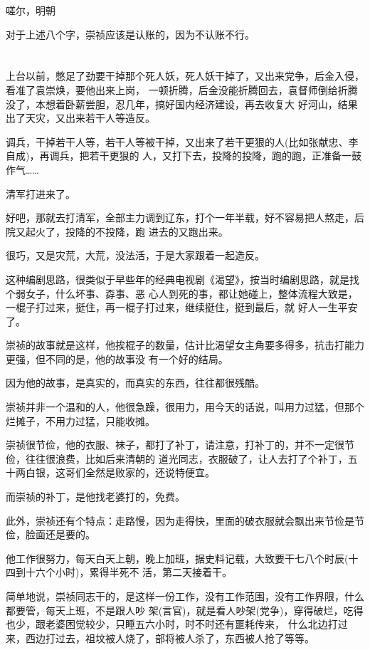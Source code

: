\documentclass[11pt,a4paper,onecolumn]{article}
\begin{document}
嗟尔，明朝

对于上述八个字，崇祯应该是认账的，因为不认账不行。

\section[\thesection]{}

上台以前，憋足了劲要干掉那个死人妖，死人妖干掉了，又出来党争，后金入侵，看准了袁崇焕，要他出来上岗，
一顿折腾，后金没能折腾回去，袁督师倒给折腾没了，本想着卧薪尝胆，忍几年，搞好国内经济建设，再去收复大
好河山，结果出了天灾，又出来若干人等造反。

调兵，干掉若干人等，若干人等被干掉，又出来了若干更狠的人(比如张献忠、李自成)，再调兵，把若干更狠的
人，又打下去，投降的投降，跑的跑，正准备一鼓作气……

清军打进来了。

好吧，那就去打清军，全部主力调到辽东，打个一年半载，好不容易把人熬走，后院又起火了，投降的不投降，跑
进去的又跑出来。

很巧，又是灾荒，大荒，没法活，于是大家跟着一起造反。

这种编剧思路，很类似于早些年的经典电视剧《渴望》，按当时编剧思路，就是找个弱女子，什么坏事、孬事、恶
心人到死的事，都让她碰上，整体流程大致是，一棍子打过来，挺住，再一棍子打过来，继续挺住，挺到最后，就
好人一生平安了。

崇祯的故事就是这样，他挨棍子的数量，估计比渴望女主角要多得多，抗击打能力更强，但不同的是，他的故事没
有一个好的结局。

因为他的故事，是真实的，而真实的东西，往往都很残酷。

崇祯并非一个温和的人，他很急躁，很用力，用今天的话说，叫用力过猛，但那个烂摊子，不用力过猛，只能收摊。

崇祯很节俭，他的衣服、袜子，都打了补丁，请注意，打补丁的，并不一定很节俭，往往很浪费，比如后来清朝的
道光同志，衣服破了，让人去打了个补丁，五十两白银，这哥们全然是败家的，还说特便宜。

而崇祯的补丁，是他找老婆打的，免费。

此外，崇祯还有个特点：走路慢，因为走得快，里面的破衣服就会飘出来\myrule 节俭是节俭，脸面还是要的。

他工作很努力，每天白天上朝，晚上加班，据史料记载，大致要干七八个时辰(十四到十六个小时)，累得半死不
活，第二天接着干。

简单地说，崇祯同志干的，是这样一份工作，没有工作范围，没有工作界限，什么都要管，每天上班，不是跟人吵
架(言官)，就是看人吵架(党争)，穿得破烂，吃得也少，跟老婆困觉较少，只睡五六小时，时不时还有噩耗传来，
什么北边打过来，西边打过去，祖坟被人烧了，部将被人杀了，东西被人抢了等等。
\end{document}
